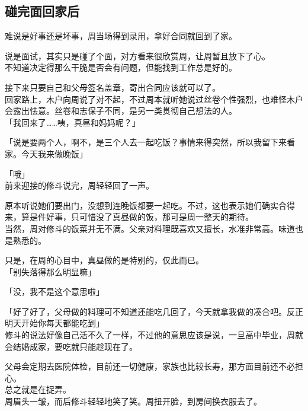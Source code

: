 \subsection{碰完面回家后}

难说是好事还是坏事，周当场得到录用，拿好合同就回到了家。

说是面试，其实只是碰了个面，对方看来很欣赏周，让周暂且放下了心。\\

不知道决定得那么干脆是否会有问题，但能找到工作总是好的。

接下来只要自己和父母签名盖章，寄出合同应该就可以了。\\

回家路上，木户向周说了对不起，不过周本就听她说过丝卷个性强烈，也难怪木户会露出怯意。丝卷和志保子不同，是另一类贯彻自己想法的人。\\

「我回来了……咦，真昼和妈妈呢？」

「说是要两个人，啊不，是三个人去一起吃饭？事情来得突然，所以我留下来看家。今天我来做晚饭」

「哦」\\

前来迎接的修斗说完，周轻轻回了一声。

原本听说她们要出门，没想到连晚饭都要一起吃。不过，这也表示她们确实合得来，算是件好事，只可惜没了真昼做的饭，那可是周一整天的期待。\\

当然，周对修斗的饭菜并无不满。父亲对料理既喜欢又擅长，水准非常高。味道也是熟悉的。

只是，在周的心目中，真昼做的是特别的，仅此而已。\\

「别失落得那么明显嘛」

「没，我不是这个意思啦」

「好了好了，父母做的料理可不知道还能吃几回了，今天就拿我做的凑合吧。反正明天开始你每天都能吃到」\\

修斗的说法好像自己活不久了一样，不过他的意思应该是说，一旦高中毕业，周就会结婚成家，要吃就只能趁现在了。

父母会定期去医院体检，目前还一切健康，家族也比较长寿，那方面目前还不必担心。\\

总之就是在捉弄。\\

周眉头一皱，而后修斗轻轻地笑了笑。周扭开脸，到房间换衣服去了。\\

